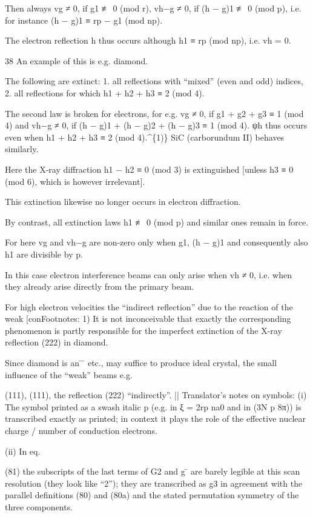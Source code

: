 \documentclass[10pt]{article}
\begin{document}
Then always vg ≠ 0, if g1 ≢ 0 (mod r), vh−g ≠ 0, if (h − g)1 ≢ 0 (mod p), i.e. for instance (h − g)1 ≡ rp − g1 (mod np).\par
The electron reflection h thus occurs although h1 ≡ rp (mod np), i.e. vh = 0.\par
38 An example of this is e.g. diamond.\par
The following are extinct: 1. all reflections with “mixed” (even and odd) indices, 2. all reflections for which h1 + h2 + h3 ≡ 2 (mod 4).\par
The second law is broken for electrons, for e.g. vg ≠ 0, if g1 + g2 + g3 ≡ 1 (mod 4) and vh−g ≠ 0, if (h − g)1 + (h − g)2 + (h − g)3 ≡ 1 (mod 4). ψh thus occurs even when h1 + h2 + h3 ≡ 2 (mod 4).\textasciicircum{}\{1)\} SiC (carborundum II) behaves similarly.\par
Here the X-ray diffraction h1 − h2 ≡ 0 (mod 3) is extinguished [unless h3 ≡ 0 (mod 6), which is however irrelevant].\par
This extinction likewise no longer occurs in electron diffraction.\par
By contrast, all extinction laws h1 ≢ 0 (mod p) and similar ones remain in force.\par
For here vg and vh−g are non-zero only when g1, (h − g)1 and consequently also h1 are divisible by p.\par
In this case electron interference beams can only arise when vh ≠ 0, i.e. when they already arise directly from the primary beam.\par
For high electron velocities the “indirect reflection” due to the reaction of the weak [conFootnotes: 1) It is not inconceivable that exactly the corresponding phenomenon is partly responsible for the imperfect extinction of the X-ray reflection (222) in diamond.\par
Since diamond is an ̄ ̄ etc., may suffice to produce ideal crystal, the small influence of the “weak” beams e.g.\par
(111), (111), the reflection (222) “indirectly”. || Translator’s notes on symbols: (i) The symbol printed as a swash italic p (e.g. in ξ = 2rp na0 and in (3N p 8π)) is transcribed exactly as printed; in context it plays the role of the effective nuclear charge / number of conduction electrons.\par
(ii) In eq.\par
(81) the subscripts of the last terms of G2 and g ̄ are barely legible at this scan resolution (they look like “2”); they are transcribed as g3 in agreement with the parallel definitions (80) and (80a) and the stated permutation symmetry of the three components.\par
\end{document}
